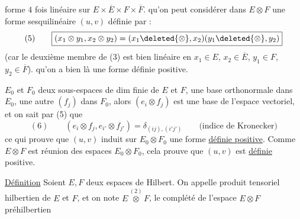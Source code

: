 forme $4$ fois linéaire sur $E\times\overline E\times F\times\overline F$.
  qu'on peut considérer dans $E\otimes F$  une forme sesquilinéaire $(u,v)$ définie par  :
\[
(5)\qquad\boxed{(x_1\otimes y_1,x_2\otimes y_2)=(x_1\deleted{\otimes},x_2)(y_1\deleted{\otimes},y_2)}
\]
(car le deuxième membre de (3) est bien linéaire en $x_1\in E$, $x_2\in\overline E$, $y_1\in F$, $y_2\in\overline F$).
  qu'on a bien là une forme définie positive.

  $E_0$ et $F_0$  deux sous-espaces de dim finie de $E$ et $F$,   une base orthonormale  dans $E_0$, une autre $(f_j)$ dans $F_0$,
alors $(e_i\otimes f_j)$ est une base de l'espace vectoriel, et on sait par (5) que
\[
(6)\qquad(e_i\otimes f_j,e_{i'}\otimes f_{j'})=\delta_{(ij),(i'j')}\qquad\text{(indice de Kronecker)}
\]
ce qui prouve que $(u,v)$ induit sur $E_0\otimes F_0$ une forme \uline{définie positive}.
Comme $E\otimes F$ est réunion des espaces $E_0\otimes F_0$, cela prouve que $(u,v)$ est \uline{définie} positive.

\uline{Définition} Soient $E,F$ deux espaces de Hilbert. On appelle produit tensoriel hilbertien de $E$ et $F$, et on note $E\overset{(2)}{\otimes}F$, le complété de l'espace  $E\otimes F$ préhilbertien
